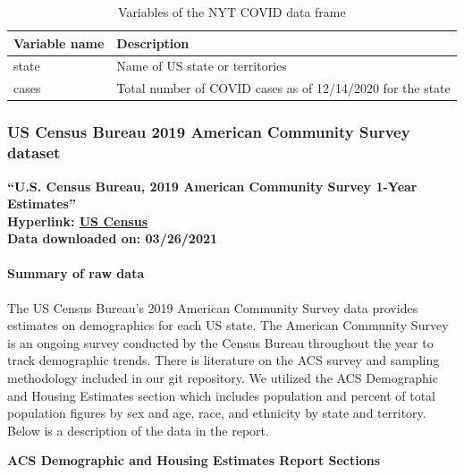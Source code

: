 \documentclass[
]{article}
\begin{document}
\begin{table}[!h]

\caption{\label{tab:NYT_processed}Variables of the NYT COVID data frame}
\centering
\begin{tabular}[t]{l|>{\raggedright\arraybackslash}p{6cm}}
\hline
Variable name & Description\\
\hline
state & Name of US state or territories\\
\hline
cases & Total number of COVID cases as of 12/14/2020 for the state\\
\hline
\end{tabular}
\end{table}

\hypertarget{us-census-bureau-2019-american-community-survey-dataset}{%
\subsubsection{US Census Bureau 2019 American Community Survey
dataset}\label{us-census-bureau-2019-american-community-survey-dataset}}

\textbf{``U.S. Census Bureau, 2019 American Community Survey 1-Year
Estimates'' }\\
\textbf{Hyperlink:
\href{https://data.census.gov/cedsci/table?q=ACS\&g=0100000US.04000.001\&tid=ACSDP1Y2019.DP05\&moe=false\&hidePreview=true}{US
Census}}\\
\textbf{Data downloaded on: 03/26/2021 }

\hypertarget{summary-of-raw-data-1}{%
\paragraph{\texorpdfstring{Summary of raw data\\
}{Summary of raw data }}\label{summary-of-raw-data-1}}

The US Census Bureau's 2019 American Community Survey data provides
estimates on demographics for each US state. The American Community
Survey is an ongoing survey conducted by the Census Bureau throughout
the year to track demographic trends. There is literature on the ACS
survey and sampling methodology included in our git repository. We
utilized the ACS Demographic and Housing Estimates section which
includes population and percent of total population figures by sex and
age, race, and ethnicity by state and territory. Below is a description
of the data in the report.

\textbf{ACS Demographic and Housing Estimates Report Sections}
\end{document}
